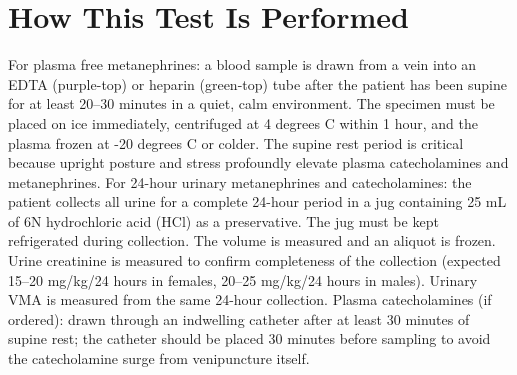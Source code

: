 \section*{How This Test Is Performed}
For plasma free metanephrines: a blood sample is drawn from a vein into an EDTA (purple-top) or heparin (green-top) tube after the patient has been supine for at least 20--30 minutes in a quiet, calm environment. The specimen must be placed on ice immediately, centrifuged at 4 degrees C within 1 hour, and the plasma frozen at -20 degrees C or colder. The supine rest period is critical because upright posture and stress profoundly elevate plasma catecholamines and metanephrines. For 24-hour urinary metanephrines and catecholamines: the patient collects all urine for a complete 24-hour period in a jug containing 25 mL of 6N hydrochloric acid (HCl) as a preservative. The jug must be kept refrigerated during collection. The volume is measured and an aliquot is frozen. Urine creatinine is measured to confirm completeness of the collection (expected 15--20 mg/kg/24 hours in females, 20--25 mg/kg/24 hours in males). Urinary VMA is measured from the same 24-hour collection. Plasma catecholamines (if ordered): drawn through an indwelling catheter after at least 30 minutes of supine rest; the catheter should be placed 30 minutes before sampling to avoid the catecholamine surge from venipuncture itself.

